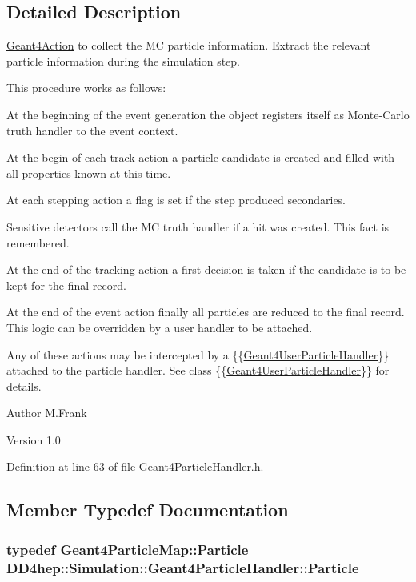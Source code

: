 \subsection{Detailed Description}
\hyperlink{class_d_d4hep_1_1_simulation_1_1_geant4_action}{Geant4Action} to collect the MC particle information. Extract the relevant particle information during the simulation step.

This procedure works as follows:
\begin{DoxyItemize}
\item At the beginning of the event generation the object registers itself as Monte-\/Carlo truth handler to the event context.
\item At the begin of each track action a particle candidate is created and filled with all properties known at this time.
\item At each stepping action a flag is set if the step produced secondaries.
\item Sensitive detectors call the MC truth handler if a hit was created. This fact is remembered.
\item At the end of the tracking action a first decision is taken if the candidate is to be kept for the final record.
\item At the end of the event action finally all particles are reduced to the final record. This logic can be overridden by a user handler to be attached.
\end{DoxyItemize}Any of these actions may be intercepted by a \{\{\hyperlink{class_d_d4hep_1_1_simulation_1_1_geant4_user_particle_handler}{Geant4UserParticleHandler}\}\} attached to the particle handler. See class \{\{\hyperlink{class_d_d4hep_1_1_simulation_1_1_geant4_user_particle_handler}{Geant4UserParticleHandler}\}\} for details.

\begin{DoxyAuthor}{Author}
M.Frank 
\end{DoxyAuthor}
\begin{DoxyVersion}{Version}
1.0 
\end{DoxyVersion}


Definition at line 63 of file Geant4ParticleHandler.h.

\subsection{Member Typedef Documentation}
\hypertarget{class_d_d4hep_1_1_simulation_1_1_geant4_particle_handler_a69214f487c50f6fd550571f37e715117}{
\subsubsection[{Particle}]{\setlength{\rightskip}{0pt plus 5cm}typedef {\bf Geant4ParticleMap::Particle} {\bf DD4hep::Simulation::Geant4ParticleHandler::Particle}}}
\label{class_d_d4hep_1_1_simulation_1_1_geant4_particle_handler_a69214f487c50f6fd550571f37e715117}


